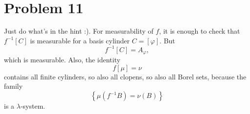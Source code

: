 \section*{Problem 11}

Just do what's in the hint :). For measurability of \( f \), it is enough to check that \( f^{-1}[C] \) is measurable for a basis cylinder \( C = \left[ \varphi \right] \). But
\[ 
    f^{-1} [ C ] = A_\varphi,
\]
which is measurable. Also, the identity
\[ 
    f[\mu] = \nu 
\]
contains all finite cylinders, so also all clopens, so also all Borel sets, because the family
\[ 
    \left\{ \mu( f^{-1} B ) = \nu(B) \right\} 
\]
is a \(\lambda \)-system.
